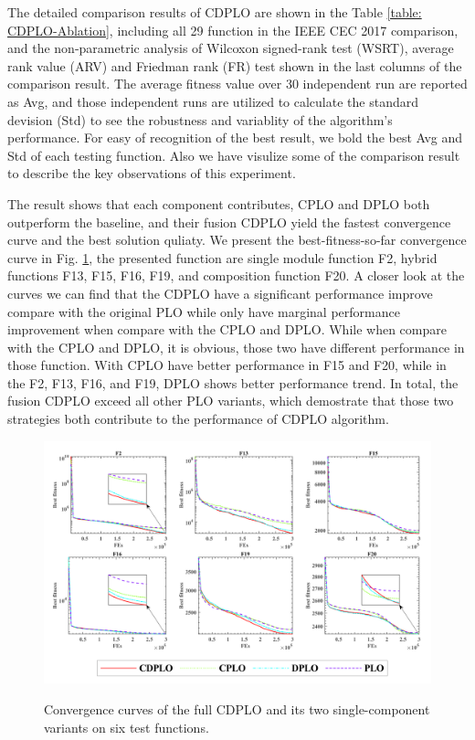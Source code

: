 \documentclass[3p]{elsarticle}
\begin{document}
The detailed comparison results of CDPLO are shown in the Table \ref{table: CDPLO-Ablation}, including all 29 function in the IEEE CEC 2017 comparison, and the non-parametric analysis of Wilcoxon signed-rank test (WSRT), average rank value (ARV) and Friedman rank (FR) test shown in the last columns of the comparison result. The average fitness value over 30 independent run are reported as Avg, and those independent runs are utilized to calculate the standard devision (Std) to see the robustness and variablity of the algorithm's performance. For easy of recognition of the best result, we bold the best Avg and Std of each testing function. Also we have visulize some of the comparison result to describe the key observations of this experiment.

The result shows that each component contributes, CPLO and DPLO both outperform the baseline, and their fusion CDPLO yield the fastest convergence curve and the best solution quliaty. We present the best-fitness-so-far convergence curve in Fig. \ref{fig: CDPLO-Ablation-CC}, the presented function are single module function F2, hybrid functions F13, F15, F16, F19, and composition function F20. A closer look at the curves we can find that the CDPLO have a significant performance improve compare with the original PLO while only have marginal performance improvement when compare with the CPLO and DPLO. While when compare with the CPLO and DPLO, it is obvious, those two have different performance in those function. With CPLO have better performance in F15 and F20, while in the F2, F13, F16, and F19, DPLO shows better performance trend. In total, the fusion CDPLO exceed all other PLO variants, which demostrate that those two strategies both contribute to the performance of CDPLO algorithm. 

\begin{figure}
\centering
\caption{Convergence curves of the full CDPLO and its
           two single-component variants on six test
           functions.}
\includegraphics[width=\linewidth]{CDPLO-Ablation}
\label{fig: CDPLO-Ablation-CC}
\end{figure}
\end{document}
